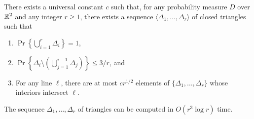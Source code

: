\documentclass{patmorin}
\begin{document}
\begin{thm}
There exists a universal
constant $c$ such that, for any probability measure $D$ over $\mathbb{R}^2$ and any 
integer $r\ge 1$, there exists a sequence
$\langle \Delta_1,\ldots,\Delta_r\rangle$ of closed triangles such that
  \begin{enumerate}
    \item $\Pr\left\{\bigcup_{i=1}^r \Delta_i\right\} = 1$,
  
    \item $\Pr\left\{\Delta_i \setminus
    \left(\bigcup_{j=1}^{i-1}\Delta_j\right)\right\} \le 3/r$, and
  
    \item For any line $\ell$, there are at most $cr^{1/2}$ elements of
    $\{\Delta_1,\ldots,\Delta_r\}$ whose interiors intersect $\ell$.
  \end{enumerate}
  The sequence $\Delta_1,\ldots,\Delta_r$ of triangles can be computed
  in $O(r^3\log r)$ time.
\end{thm}

\def\isdef{\buildrel {\rm def} \over =}
\def\PROB{\Pr}
\end{document}
